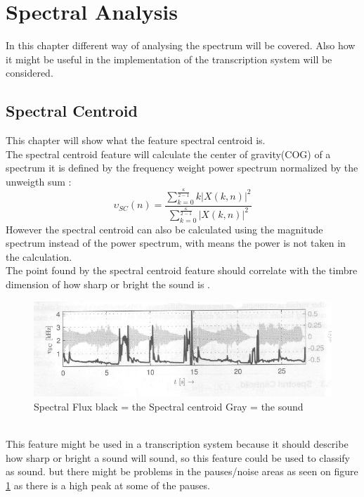 \section{Spectral Analysis}
In this chapter different way of analysing the spectrum will be covered. Also how it might be useful in the implementation of the transcription system will be considered.
\subsection{Spectral Centroid}
This chapter will show what the feature spectral centroid is.\\
The spectral centroid feature will calculate the center of gravity(COG) of a spectrum it is defined by the frequency weight power spectrum normalized by the unweigth sum \citep{ACA}:
\begin{equation}\label{Spectral Centroid eq}
	\upsilon_{SC}(n) = \frac{\displaystyle\sum_{k = 0}^{\frac{\kappa}{2-1}} k\vert X(k,n) \vert^2}{\displaystyle\sum_{k = 0}^{\frac{\kappa}{2-1}} \vert X(k,n) \vert^2 }    
\end{equation} 
However the spectral centroid can also be calculated using the magnitude spectrum instead of the power spectrum, with means the power is not taken in the calculation\citep{ACA}.
\\
The point found by the spectral centroid feature should correlate with the timbre dimension of how sharp or bright the sound is \citep{ACA}. 

\begin{figure}[h]
	\begin{center}
		\includegraphics[scale = 0.5]{fig/spectral_centroid.jpg}
		\caption{Spectral Flux black = the Spectral centroid Gray = the sound \citep{ACA}}
		\label{Spectral centroid pic}
	\end{center}
\end{figure}

\\
This feature might be used in a transcription system because it should describe how sharp or bright a sound will sound, so this feature could be used to classify as sound. but there might be problems in the pauses/noise areas as seen on figure \ref{Spectral centroid pic} as there is a high peak at some of the pauses. 
